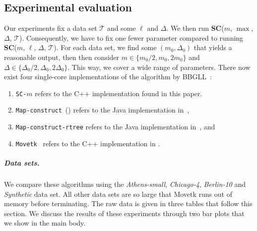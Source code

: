 \documentclass[11pt]{article}
\begin{document}
    \subsection{Experimental evaluation}
    \label{sub:comparison} 
%
%
%
Our experiments fix a data set $\mathcal{T}$ and some $\ell$ and $\Delta$. 
We then run \textbf{SC}($m$, $\max$, $\Delta$, $\mathcal{T}$).
Consequently, we have to fix one fewer parameter compared to running \textbf{SC}($m$, $\ell$, $\Delta$, $\mathcal{T}$). 
For each data set, we find some $(m_0, \Delta_0)$ that yields a reasonable output, then then consider $m \in \{m_0/2, m_0, 2 m_0\}$ and $\Delta \in \{\Delta_0/2, \Delta_0, 2 \Delta_0\}$.
This way, we cover a wide range of parameters.
There now exist four single-core implementations of the algorithm by BBGLL~\cite{buchin2011detecting}:
%
\begin{enumerate}
    \item \texttt{SC-$m$} refers to the C++ implementation found in this paper. 
    \item \texttt{Map-construct}~(\cite{buchin2017clustering}) refers to the Java implementation in~\cite{buchin2017clustering},
    \item \texttt{Map-construct-rtree} refers to the Java implementation in~\cite{buchin2020improved}, and
    \item \texttt{Movetk}~\cite{movetk} refers to the C++ implementation in \cite{movetk}. 
\end{enumerate}
%
\subparagraph{Data sets.}
We compare these algorithms using the \emph{Athens-small}, \emph{Chicago-4}, \emph{Berlin-10} and \emph{Synthetic} data set.
All other data sets are so large that Movetk runs out of memory before terminating. 
The raw data is given in three tables that follow this section.
We discuss the results of these experiments through two bar plots that we show in the main body. 
%
%
\clearpage
%
\end{document}
